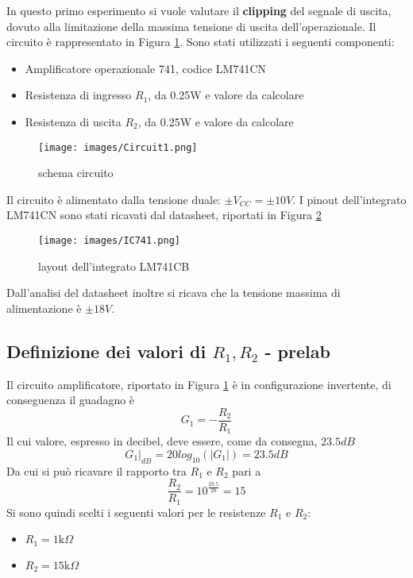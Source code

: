 In questo primo esperimento si vuole valutare il \textbf{clipping} del segnale di uscita, dovuto alla limitazione della massima tensione di uscita dell'operazionale. Il circuito è rappresentato in Figura \ref{fig:Circuito1}. Sono stati utilizzati i seguenti componenti:
\begin{itemize}
    \item Amplificatore operazionale 741, codice LM741CN
    \item Resistenza di ingresso $R_1$, da 0.25W e valore da calcolare
    \item Resistenza di uscita $R_2$, da 0.25W e valore da calcolare
\end{itemize}
\begin{figure}[H]
    \centering
    \texttt{[image: images/Circuit1.png]}
    \caption{schema circuito}
    \label{fig:Circuito1}
\end{figure}
Il circuito è alimentato dalla tensione duale: $\pm V_{CC}=\pm 10V$. I pinout dell'integrato LM741CN sono stati ricavati dal datasheet, riportati in Figura \ref{fig:IC741}
\begin{figure}[H]
    \centering
    \texttt{[image: images/IC741.png]}
    \caption{layout dell'integrato LM741CB }
    \label{fig:IC741}
\end{figure}
Dall'analisi del datasheet inoltre si ricava che la tensione massima di alimentazione è $\pm 18V$.
\subsection{Definizione dei valori di $R_1,R_2$ - prelab}
Il circuito amplificatore, riportato in Figura \ref{fig:Circuito1} è in configurazione invertente, di conseguenza il guadagno è
\begin{equation}
    G_1=-\frac{R_2}{R_1}
\end{equation}
Il cui valore, espresso in decibel, deve essere, come da consegna, $23.5dB$
\begin{equation}
    G_1\big|_{dB} = 20log_{10}(|G_1|) = 23.5dB
\end{equation}
Da cui si può ricavare il rapporto tra $R_1$ e $R_2$ pari a 
\begin{equation}
    \frac{R_2}{R_1}=10^{\frac{23.5}{20}}=15
\end{equation}
Si sono quindi scelti i seguenti valori per le resistenze $R_1$ e $R_2$:
\begin{itemize}
    \item $R_1=1\text{k}\Omega$
    \item $R_2=15\text{k}\Omega$
\end{itemize}
